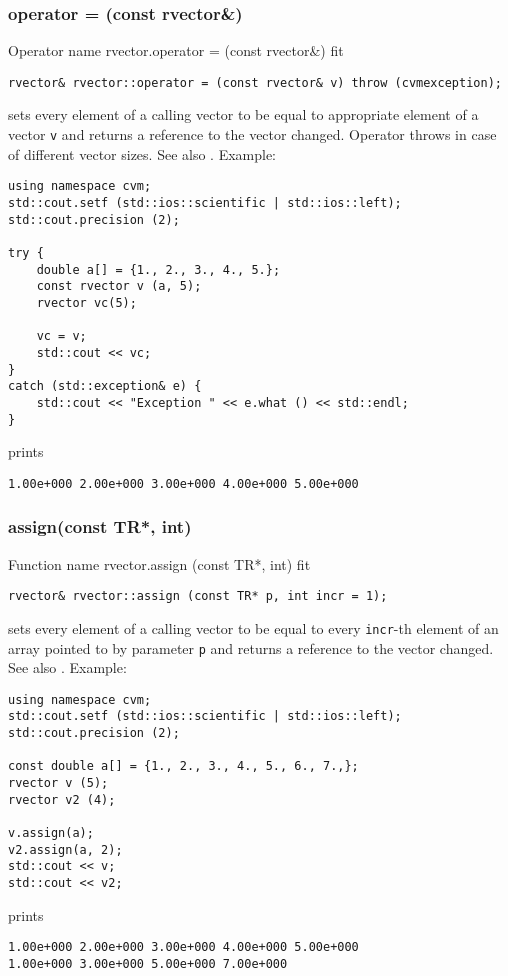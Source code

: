 \subsubsection{operator = (const rvector\&)}
Operator%
\pdfdest name {rvector.operator = (const rvector&)} fit
\begin{verbatim}
rvector& rvector::operator = (const rvector& v) throw (cvmexception);
\end{verbatim}
sets every element of a calling vector to be equal to
appropriate element of a vector \verb"v"
and returns a reference to
the vector changed.
Operator throws  
in case of different vector sizes.
See also .
Example:
\begin{Verbatim}
using namespace cvm;
std::cout.setf (std::ios::scientific | std::ios::left); 
std::cout.precision (2);

try {
    double a[] = {1., 2., 3., 4., 5.};
    const rvector v (a, 5);
    rvector vc(5);

    vc = v;
    std::cout << vc;
}
catch (std::exception& e) {
    std::cout << "Exception " << e.what () << std::endl;
}
\end{Verbatim}
prints
\begin{Verbatim}
1.00e+000 2.00e+000 3.00e+000 4.00e+000 5.00e+000
\end{Verbatim}
\newpage



\subsubsection{assign(const TR*, int)}
Function%
\pdfdest name {rvector.assign (const TR*, int)} fit
\begin{verbatim}
rvector& rvector::assign (const TR* p, int incr = 1);
\end{verbatim}
sets every element of a calling vector to be equal to
every \verb"incr"-th element of an array  pointed to by parameter \verb"p"
and returns a reference to the vector changed.
See also .
Example:
\begin{Verbatim}
using namespace cvm;
std::cout.setf (std::ios::scientific | std::ios::left); 
std::cout.precision (2);

const double a[] = {1., 2., 3., 4., 5., 6., 7.,};
rvector v (5);
rvector v2 (4);

v.assign(a);
v2.assign(a, 2);
std::cout << v;
std::cout << v2;
\end{Verbatim}
prints
\begin{Verbatim}
1.00e+000 2.00e+000 3.00e+000 4.00e+000 5.00e+000
1.00e+000 3.00e+000 5.00e+000 7.00e+000
\end{Verbatim}
\newpage


